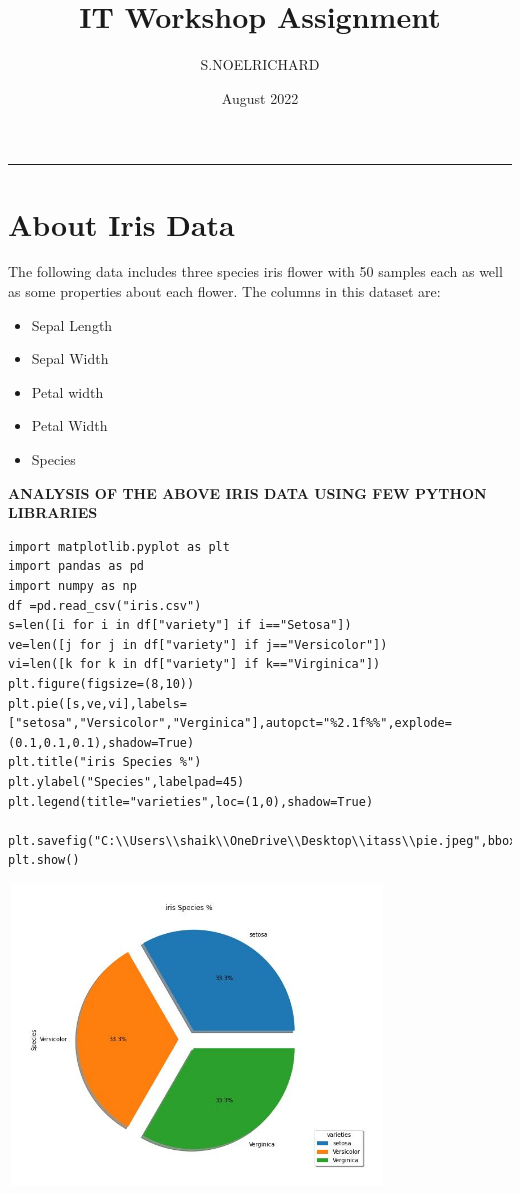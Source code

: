 \documentclass[12pt,a4paper]{article}
\title{IT Workshop Assignment }
\author{S.NOELRICHARD}
\affil{B192122}
\affil{CSE-C5}
\date{August 2022}
\begin{document}
\maketitle\vskip-15pt\hrule\vskip15pt


\section{About Iris Data}
The following data includes three species iris flower with 50 samples each as well as
some properties about each flower.
The columns in this dataset are:
\begin{itemize}
\color{brown}
\item Sepal Length
\color{red}
\item Sepal Width
\color{cyan}
\item Petal width
\color{lime}
\item Petal Width
\color{teal}
\item Species
\end{itemize}

\textbf{ANALYSIS OF THE ABOVE IRIS DATA USING FEW PYTHON LIBRARIES}



\begin{verbatim}
import matplotlib.pyplot as plt
import pandas as pd
import numpy as np
df =pd.read_csv("iris.csv")
s=len([i for i in df["variety"] if i=="Setosa"])
ve=len([j for j in df["variety"] if j=="Versicolor"])
vi=len([k for k in df["variety"] if k=="Virginica"])
plt.figure(figsize=(8,10))
plt.pie([s,ve,vi],labels=["setosa","Versicolor","Verginica"],autopct="%2.1f%%",explode=(0.1,0.1,0.1),shadow=True)
plt.title("iris Species %")
plt.ylabel("Species",labelpad=45)
plt.legend(title="varieties",loc=(1,0),shadow=True)

plt.savefig("C:\\Users\\shaik\\OneDrive\\Desktop\\itass\\pie.jpeg",bbox_inches="tight",pad_inches=0.5)
plt.show()
\end{verbatim}

\includegraphics[width=10cm, height=8cm]{pie.jpeg}
\end{document}
